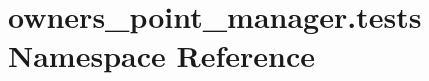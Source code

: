 \hypertarget{namespaceowners__point__manager_1_1tests}{\section{owners\-\_\-point\-\_\-manager.\-tests Namespace Reference}
\label{namespaceowners__point__manager_1_1tests}
}
